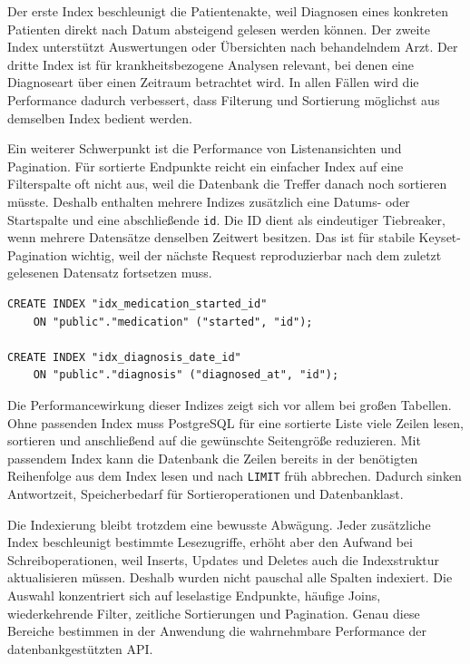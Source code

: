 Der erste Index beschleunigt die Patientenakte, weil Diagnosen eines konkreten Patienten direkt nach Datum absteigend gelesen werden können. Der zweite Index unterstützt Auswertungen oder Übersichten nach behandelndem Arzt. Der dritte Index ist für krankheitsbezogene Analysen relevant, bei denen eine Diagnoseart über einen Zeitraum betrachtet wird. In allen Fällen wird die Performance dadurch verbessert, dass Filterung und Sortierung möglichst aus demselben Index bedient werden.

Ein weiterer Schwerpunkt ist die Performance von Listenansichten und Pagination. Für sortierte Endpunkte reicht ein einfacher Index auf eine Filterspalte oft nicht aus, weil die Datenbank die Treffer danach noch sortieren müsste. Deshalb enthalten mehrere Indizes zusätzlich eine Datums- oder Startspalte und eine abschließende \texttt{id}. Die ID dient als eindeutiger Tiebreaker, wenn mehrere Datensätze denselben Zeitwert besitzen. Das ist für stabile Keyset-Pagination wichtig, weil der nächste Request reproduzierbar nach dem zuletzt gelesenen Datensatz fortsetzen muss.

\begin{lstlisting}[style=sqlstyle, caption={Indexstruktur für stabile zeitbasierte Pagination}]
CREATE INDEX "idx_medication_started_id"
    ON "public"."medication" ("started", "id");

CREATE INDEX "idx_diagnosis_date_id"
    ON "public"."diagnosis" ("diagnosed_at", "id");
\end{lstlisting}

Die Performancewirkung dieser Indizes zeigt sich vor allem bei großen Tabellen. Ohne passenden Index muss PostgreSQL für eine sortierte Liste viele Zeilen lesen, sortieren und anschließend auf die gewünschte Seitengröße reduzieren. Mit passendem Index kann die Datenbank die Zeilen bereits in der benötigten Reihenfolge aus dem Index lesen und nach \texttt{LIMIT} früh abbrechen. Dadurch sinken Antwortzeit, Speicherbedarf für Sortieroperationen und Datenbanklast.

Die Indexierung bleibt trotzdem eine bewusste Abwägung. Jeder zusätzliche Index beschleunigt bestimmte Lesezugriffe, erhöht aber den Aufwand bei Schreiboperationen, weil Inserts, Updates und Deletes auch die Indexstruktur aktualisieren müssen. Deshalb wurden nicht pauschal alle Spalten indexiert. Die Auswahl konzentriert sich auf leselastige Endpunkte, häufige Joins, wiederkehrende Filter, zeitliche Sortierungen und Pagination. Genau diese Bereiche bestimmen in der Anwendung die wahrnehmbare Performance der datenbankgestützten API.


